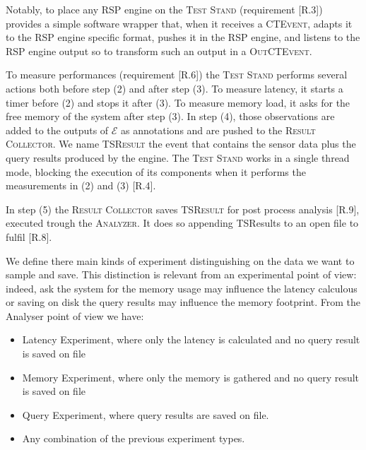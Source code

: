 Notably, to place any RSP engine on the \textsc{Test Stand} (requirement [R.3]) \name provides a simple software wrapper that, when it receives a \textsc{CTEvent}, adapts it to the RSP engine specific format, pushes it in the RSP engine, and listens to the RSP engine output so to transform such an output in a \textsc{OutCTEvent}.

To measure performances (requirement [R.6]) the \textsc{Test Stand} performs several actions both before step (2) and after step (3). To measure latency, it starts a timer before (2) and stops it after (3). To measure memory load, it asks for the free memory of the system after step (3). In step (4), those observations are added to the outputs of $\mathcal{E}$ as annotations and are pushed to the \textsc{Result Collector}.  We name \textsc{TSResult} the event that contains the sensor data plus the query results produced by the engine.  The \textsc{Test Stand} works in a single thread mode, blocking the execution of its components when it performs the measurements in (2) and (3) [R.4].  

In step (5) the \textsc{Result Collector} saves \textsc{TSResult} for post process analysis [R.9], executed trough the \textsc{Analyzer}. It does so appending TSResults to an open file to fulfil [R.8].

We define there main kinds of experiment distinguishing on the data we want to sample and save. This distinction is relevant from an experimental point of view: indeed, ask the system for the memory usage may influence the latency calculous or saving on disk the query results may influence the memory footprint. From the Analyser point of view we have:
\begin{itemize}
\item Latency Experiment, where only the latency is calculated and no query result is saved on file
\item Memory Experiment, where only the memory is gathered and no query result is saved on file
\item Query Experiment, where query results are saved on file.
\item Any combination of the previous experiment types.
\end{itemize}

